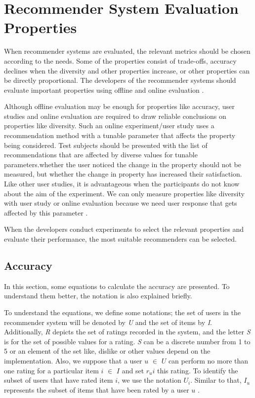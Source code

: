 
\section{Recommender System Evaluation Properties}\label{section:evaluation_metrics}

When recommender systems are evaluated, the relevant metrics should be chosen according to the needs. Some of the properties consist of trade-offs, accuracy declines when the diversity and other properties increase, or other properties can be directly proportional. The developers of the recommender systems should evaluate important properties using offline and online evaluation \cite{shani2011evaluating}.

Although offline evaluation may be enough for properties like accuracy, user studies and online evaluation are required to draw reliable conclusions on properties like diversity. Such an online experiment/user study uses a recommendation method with a tunable parameter that affects the property being considered. Test subjects should be presented with the list of recommendations that are affected by diverse values for tunable parameters.whether the user noticed the change in the property should not be measured, but whether the change in property has increased their satisfaction. Like other user studies, it is advantageous when the participants do not know about the aim of the experiment. We can only measure properties like diversity with user study or online evaluation because we need user response that gets affected by this parameter \cite{shani2011evaluating}.

When the developers conduct experiments to select the relevant properties and evaluate their performance, the most suitable recommenders can be selected.

\subsection{Accuracy}

In this section, some equations to calculate the accuracy are presented. To understand them better, the notation is also explained briefly. 

To understand the equations, we define some notations; the set of users in the recommender system will be denoted by \textit{U} and the set of items by \textit{I}. Additionally, \textit{R} depicts the set of ratings recorded in the system, and the letter \textit{S} is for the set of possible values for a rating. \textit{S} can be a discrete number from 1 to 5 or an element of the set {like, dislike} or other values depend on the implementation. Also, we suppose that a user $u$ $\in$  $U$ can perform no more than one rating for a particular item $i$ $\in$ $I$ and set $r_ui$ this rating. To identify the subset of users that have rated item $i$, we use the notation $U_i$. Similar to that, $I_u$ represents the subset of items that have been rated by a user $u$ \cite{shani2011evaluating}.

